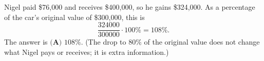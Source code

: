 Nigel paid \$76,000 and receives \$400,000, so he gains \$324,000. As a percentage of the car's original value of \$300,000, this is
\[\dfrac{324000}{300000}\cdot100\%=108\%.\]
The answer is $\boxed{\textbf{(A) }108\%}$. (The drop to $80\%$ of the original value does not change what Nigel pays or receives; it is extra information.)
